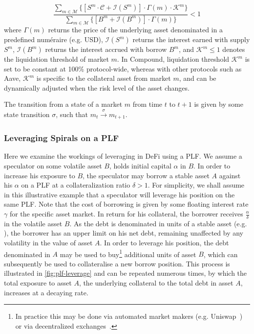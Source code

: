 \begin{equation}
    \frac{\sum_{m\in \mathcal{M}}
    \Big\{\left[S^{m} \cdot \mathcal{C} + \mathcal{I}(S^m)\right] \cdot \Gamma(m) \cdot \mathcal{K}^m \Big\}
    }{
    \sum_{m\in \mathcal{M}} \Big\{\left[B^m + \mathcal{I}(B^m)\right] \cdot \Gamma(m)\Big\}}
    < 1
    \label{eq:liqcond}
\end{equation}
where $\Gamma(m)$ returns the price of the underlying asset denominated in a predefined numéraire (e.g. USD), $\mathcal{I}(S^m)$ returns the interest earned with supply $S^m$, $\mathcal{I}(B^m)$ returns the interest accrued with borrow $B^m$, and $\mathcal{K}^m \leq 1$ denotes the liquidation threshold of market $m$. In Compound, liquidation threshold $\mathcal{K}^m$ is set to be constant at 100\% protocol-wide, whereas with other protocols such as Aave, $\mathcal{K}^m$ is specific to the collateral asset from market $m$, and can be dynamically adjusted when the risk level of the asset changes. 


The transition from a state of a market $m$ from time $t$ to $t+1$ is given by some state transition $\sigma$, such that $m_{t}\xrightarrow[]{\sigma}m_{t+1}$. 

\subsubsection{Leveraging Spirals on a PLF}
\label{ssec:leveraging-spirals-meth}
Here we examine the workings of leveraging in DeFi using a PLF. 
We assume a speculator on some volatile asset $B$, holds initial capital $\alpha$ in $B$.
In order to increase his exposure to $B$, the speculator may borrow a stable asset $A$ against his $\alpha$ on a PLF at a collateralization ratio $\delta>1$.
For simplicity, we shall assume in this illustrative example that a speculator will leverage his position on the same PLF.
Note that the cost of borrowing is given by some floating interest rate $\gamma$ for the specific asset market.
In return for his collateral, the borrower receives $\frac{\alpha}{\delta}$ in the volatile asset $B$.
As the debt is denominated in units of a stable asset (e.g. ), the borrower has an upper limit on his net debt, remaining unaffected by any volatility in the value of asset $A$.
In order to leverage his position, the debt denominated in $A$ may be used to buy\footnote{In practice this may be done via automated market makers \cite{xu2021dexamm} (e.g. Uniswap~\cite{whitepaper:uniswap}) or via decentralized exchanges~\cite{web:dydx}.} additional units of asset $B$, which can subsequently be used to collateralise a new borrow position.
This process is illustrated in \autoref{fig:plf-leverage} and can be repeated numerous times, by which the total exposure to asset $A$, the underlying collateral to the total debt in asset $A$, increases at a decaying rate.

